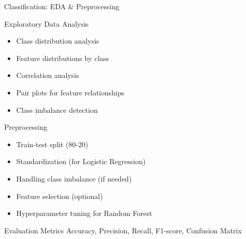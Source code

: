 \documentclass[aspectratio=169,10pt]{beamer}
\begin{document}
\begin{frame}{Classification: EDA \& Preprocessing}
\begin{block}{Exploratory Data Analysis}
\begin{itemize}
    \item Class distribution analysis
    \item Feature distributions by class
    \item Correlation analysis
    \item Pair plots for feature relationships
    \item Class imbalance detection
\end{itemize}
\end{block}

\vspace{0.3cm}

\begin{block}{Preprocessing}
\begin{itemize}
    \item Train-test split (80-20)
    \item Standardization (for Logistic Regression)
    \item Handling class imbalance (if needed)
    \item Feature selection (optional)
    \item Hyperparameter tuning for Random Forest
\end{itemize}
\end{block}

\vspace{0.3cm}

\begin{alertblock}{Evaluation Metrics}
Accuracy, Precision, Recall, F1-score, Confusion Matrix
\end{alertblock}
\end{frame}
\end{document}
